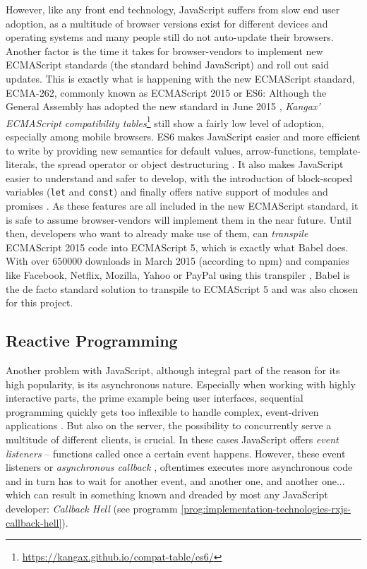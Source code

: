 However, like any front end technology, JavaScript suffers from slow end user adoption, as a multitude of browser versions exist for different devices and operating systems and many people still do not auto-update their browsers. Another factor is the time it takes for browser-vendors to implement new ECMAScript standards (the standard behind JavaScript) and roll out said updates. This is exactly what is happening with the new ECMAScript standard, ECMA-262, commonly known as ECMAScript 2015 or ES6: Although the General Assembly has adopted the new standard in June 2015 \cite{ecma2015}, \emph{Kangax' ECMAScript compatibility tables}\footnote{\url{https://kangax.github.io/compat-table/es6/}} still show a fairly low level of adoption, especially among mobile browsers. ES6 makes JavaScript easier and more efficient to write by providing new semantics for default values, arrow-functions, template-literals, the spread operator or object destructuring \cite{es6}. It also makes JavaScript easier to understand and safer to develop, with the introduction of block-scoped variables (\texttt{let} and \texttt{const}) and finally offers native support of modules and promises \cite{es6}.
As these features are all included in the new ECMAScript standard, it is safe to assume browser-vendors will implement them in the near future. Until then, developers who want to already make use of them, can \emph{transpile} ECMAScript 2015 code into ECMAScript 5, which is exactly what Babel does. With over $650000$ downloads in March 2015 (according to npm) and companies like Facebook, Netflix, Mozilla, Yahoo or PayPal using this transpiler \cite{babel-users}, Babel is the de facto standard solution to transpile to ECMAScript 5 and was also chosen for this project.

\subsection{Reactive Programming}
\label{sec:implementation-technologies-rxjs}

Another problem with JavaScript, although integral part of the reason for its high popularity, is its asynchronous nature. Especially when working with highly interactive parts, the prime example being user interfaces, sequential programming quickly gets too inflexible to handle complex, event-driven applications \cite{reactive-programming-survey}. But also on the server, the possibility to concurrently serve a multitude of different clients, is crucial. In these cases JavaScript offers \emph{event listeners} -- functions called once a certain event happens. However, these event listeners or \emph{asynchronous callback} \cite{reactive-programming-survey}, oftentimes executes more asynchronous code and in turn has to wait for another event, and another one, and another one... which can result in something known and dreaded by most any JavaScript developer: \emph{Callback Hell} (see programm \ref{prog:implementation-technologies-rxjs-callback-hell}).

